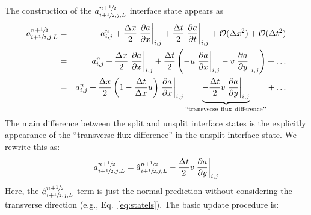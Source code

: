 The construction of the $a_{i+\sfrac{1}{2},j,L}^{n+\sfrac{1}{2}}$ interface state appears as
\begin{eqnarray}
a_{i+\sfrac{1}{2},j,L}^{n+\sfrac{1}{2}} &=& a_{i,j}^n + 
  \frac{\Delta x}{2} \left .\frac{\partial a}{\partial x} \right |_{i,j} + 
  \frac{\Delta t}{2} \left .\frac{\partial a}{\partial t} \right |_{i,j} + 
  \mathcal{O}(\Delta x^2) + \mathcal{O}(\Delta t^2) \nonumber \\
 &=& a_{i,j}^n + 
   \frac{\Delta x}{2} \left .\frac{\partial a}{\partial x} \right |_{i,j} + 
   \frac{\Delta t}{2} \left ( 
   - u \left .\frac{\partial a}{\partial x} \right |_{i,j} 
   - v \left .\frac{\partial a}{\partial y} \right |_{i,j} \right
   ) + \ldots \nonumber \\
    &=& a_{i,j}^n + 
   \frac{\Delta x}{2} \left ( 1 - \frac{\Delta t}{\Delta x} u \right ) 
   \left .\frac{\partial a}{\partial x} \right |_{i,j} \underbrace{-
   \frac{\Delta t}{2} v \left .\frac{\partial a}{\partial y} \right |_{i,j}}_{\mathrm{``transverse~flux~difference''}} +
   \ldots \label{eq:statelu}
\end{eqnarray}
The main difference between the split and unsplit interface states is the
explicitly appearance of the ``transverse flux difference'' in the unsplit
interface state.  We rewrite this as:
\begin{equation}
a_{i+\sfrac{1}{2},j,L}^{n+\sfrac{1}{2}} = \hat{a}_{i+\sfrac{1}{2},j,L}^{n+\sfrac{1}{2}} 
   - \frac{\Delta t}{2} v \left .\frac{\partial a}{\partial y} \right |_{i,j}
\end{equation}
Here, the $\hat{a}_{i+\sfrac{1}{2},j,L}^{n+\sfrac{1}{2}}$ term is just the normal
prediction without considering the transverse direction (e.g., Eq.~\ref{eq:statels}).  The basic
update procedure is:
